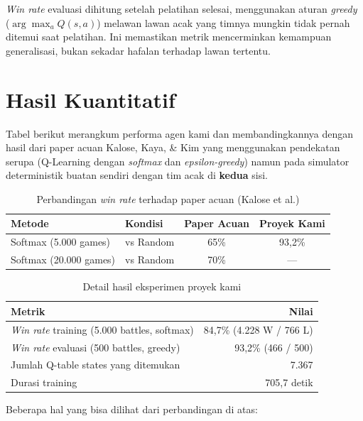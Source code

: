 \documentclass[11pt,a4paper,oneside]{report}
\begin{document}
\noindent \textit{Win rate} evaluasi dihitung setelah pelatihan selesai, menggunakan aturan \textit{greedy} ($\arg\max_a Q(s,a)$) melawan lawan acak yang timnya mungkin tidak pernah ditemui saat pelatihan. Ini memastikan metrik mencerminkan kemampuan generalisasi, bukan sekadar hafalan terhadap lawan tertentu.

\section{Hasil Kuantitatif}

Tabel berikut merangkum performa agen kami dan membandingkannya dengan hasil dari paper acuan Kalose, Kaya, \& Kim yang menggunakan pendekatan serupa (Q-Learning dengan \textit{softmax} dan \textit{epsilon-greedy}) namun pada simulator deterministik buatan sendiri dengan tim acak di \textbf{kedua} sisi.

\begin{table}[h!]
\centering
\caption{Perbandingan \textit{win rate} terhadap paper acuan (Kalose et al.)}
\label{tab:hasil}
\begin{tabular}{llcc}
\toprule
\textbf{Metode} & \textbf{Kondisi} & \textbf{Paper Acuan} & \textbf{Proyek Kami} \\
\midrule
Softmax (5.000 games)        & vs Random & 65\% & 93,2\% \\
Softmax (20.000 games)       & vs Random & 70\% & --- \\
\bottomrule
\end{tabular}
\end{table}

\begin{table}[h!]
\centering
\caption{Detail hasil eksperimen proyek kami}
\label{tab:hasil-detail}
\begin{tabular}{lr}
\toprule
\textbf{Metrik} & \textbf{Nilai} \\
\midrule
\textit{Win rate} training (5.000 battles, softmax)  & 84,7\% (4.228 W / 766 L) \\
\textit{Win rate} evaluasi (500 battles, greedy)     & 93,2\% (466 / 500) \\
Jumlah Q-table states yang ditemukan                 & 7.367 \\
Durasi training                                      & 705,7 detik \\
\bottomrule
\end{tabular}
\end{table}

Beberapa hal yang bisa dilihat dari perbandingan di atas:
\end{document}
